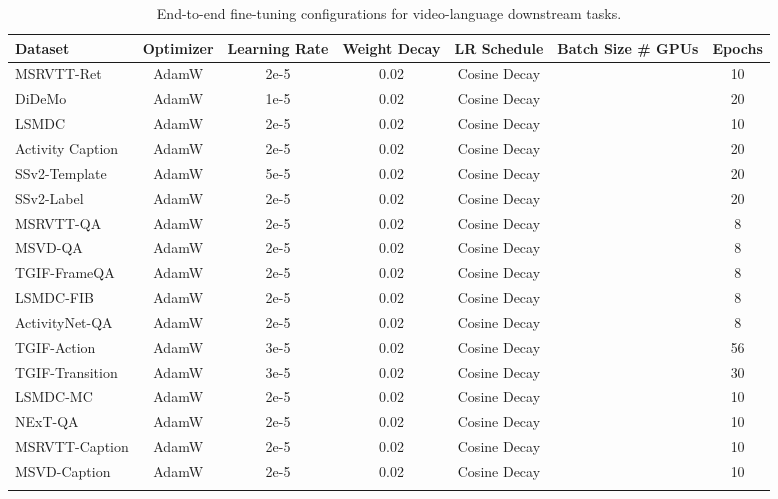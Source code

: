 \documentclass[10pt,twocolumn,letterpaper]{article}
\newlength\savewidth
\newcommand\shline{\noalign{\global\savewidth\arrayrulewidth\global\arrayrulewidth 1pt}\hline\noalign{\global\arrayrulewidth\savewidth}}
\newcommand{\tablestyle}[2]{\setlength{\tabcolsep}{#1}\renewcommand{\arraystretch}{#2}\centering\small}
\begin{document}
\begin{table*}[t]
\vspace{1em}
\tablestyle{7pt}{1.05}
\begin{tabular}{l|cccccc}
\shline
\textbf{Dataset} & \textbf{Optimizer} & \textbf{Learning Rate} & \textbf{Weight Decay} & \textbf{LR Schedule} & \textbf{Batch Size  \# GPUs} & \textbf{Epochs}\\
\hline
MSRVTT-Ret \cite{xu2016msrvtt} & AdamW & 2e-5 & 0.02 & Cosine Decay &  & 10 \\
DiDeMo \cite{anne2017didemo} & AdamW & 1e-5 & 0.02 & Cosine Decay &  & 20 \\
LSMDC \cite{rohrbach2015lsmdc} & AdamW & 2e-5 & 0.02 & Cosine Decay &  & 10 \\
Activity Caption \cite{krishna2017activitynetret} & AdamW & 2e-5 & 0.02 & Cosine Decay &  & 20 \\
SSv2-Template \cite{lei2022singularity} & AdamW & 5e-5 & 0.02 & Cosine Decay &  & 20 \\
SSv2-Label \cite{lei2022singularity} & AdamW & 2e-5 & 0.02 & Cosine Decay &  & 20 \\

MSRVTT-QA \cite{xu2017msrvttqa} & AdamW & 2e-5 & 0.02 & Cosine Decay &  & 8 \\
MSVD-QA \cite{xu2017msrvttqa} & AdamW & 2e-5 & 0.02 & Cosine Decay &  & 8 \\
TGIF-FrameQA \cite{jang2017tgif} & AdamW & 2e-5 & 0.02 & Cosine Decay &  & 8 \\
LSMDC-FIB \cite{maharaj2017lsmdcfib} & AdamW & 2e-5 & 0.02 & Cosine Decay &  & 8 \\
ActivityNet-QA \cite{yu2019activitynetqa} & AdamW & 2e-5 & 0.02 & Cosine Decay &  & 8 \\

TGIF-Action \cite{jang2017tgif} & AdamW & 3e-5 & 0.02 & Cosine Decay &  & 56 \\
TGIF-Transition \cite{jang2017tgif} & AdamW & 3e-5 & 0.02 & Cosine Decay &  & 30 \\
LSMDC-MC \cite{torabi2016lsmdcmc} & AdamW & 2e-5 & 0.02 & Cosine Decay &  & 10 \\
NExT-QA \cite{xiao2021nextqa} & AdamW & 2e-5 & 0.02 & Cosine Decay &  & 10 \\

MSRVTT-Caption \cite{xu2016msrvtt} & AdamW & 2e-5 & 0.02 & Cosine Decay &  & 10 \\
MSVD-Caption \cite{chen2011msvd} & AdamW & 2e-5 & 0.02 & Cosine Decay &  & 10 \\
\shline
\end{tabular}
\caption{End-to-end fine-tuning configurations for video-language downstream tasks.}
\label{tab:finetune_params}
\end{table*} 
\end{document}
